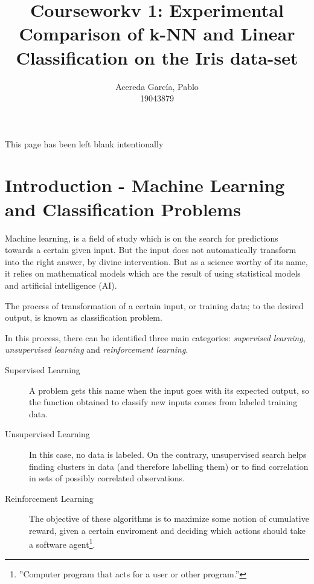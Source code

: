 \documentclass[11pt]{article}
\title{Courseworkv 1: Experimental Comparison of k-NN and Linear Classification
on the Iris data-set}
\author{
Acereda García, Pablo\\
19043879}
\begin{document}
\maketitle

\newpage
\vspace*{\fill}
 \begin{center}
This page has been left blank intentionally
 \end{center}
\vspace*{\fill}
\newpage

\tableofcontents

\newpage

\section{Introduction - Machine Learning and Classification Problems}

Machine learning, is a field of study which is on the search for predictions
towards a certain given input. But the input does not automatically transform
into the right answer, by divine intervention. But as a science worthy of its
name, it relies on mathematical models which are the result of using statistical
models and artificial intelligence (AI).

The process of transformation of a certain input, or training data; to the
desired output, is known as classification problem.

In this process, there can be identified three main categories: 
\textit{supervised learning}, \textit{unsupervised learning} and
\textit{reinforcement learning}.

\begin{description}
 
 \item [Supervised Learning] A problem gets this name when the input goes with
  its expected output, so the function obtained to classify new inputs comes
  from labeled training data.
 
 \item [Unsupervised Learning] In this case, no data is labeled. On the 
  contrary, unsupervised search helps finding clusters in data (and therefore 
  labelling them) or to find correlation in sets of possibly correlated 
  observations.

 \item [Reinforcement Learning] The objective of these algorithms is to maximize
  some notion of cumulative reward, given a certain enviroment and deciding
  which actions should take a software agent\footnote{''Computer program that
  acts for a user or other program.''}.

\end{description}
\end{document}
